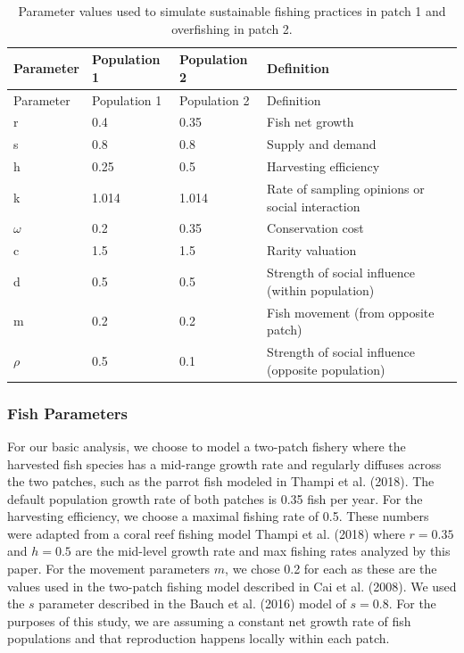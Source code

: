 \documentclass[
  12pt,
]{article}
\begin{document}
\begin{longtable}[]{@{}llll@{}}
\caption{\label{tab:DispersionParamTable}Parameter values used to simulate sustainable fishing practices in patch 1 and overfishing in patch 2. \label{DispersionParamTable}}\tabularnewline
\toprule()
Parameter & Population 1 & Population 2 & Definition \\
\midrule()
\endfirsthead
\toprule()
Parameter & Population 1 & Population 2 & Definition \\
\midrule()
\endhead
r & 0.4 & 0.35 & Fish net growth \\
s & 0.8 & 0.8 & Supply and demand \\
h & 0.25 & 0.5 & Harvesting efficiency \\
k & 1.014 & 1.014 & Rate of sampling opinions or social interaction \\
\(\omega\) & 0.2 & 0.35 & Conservation cost \\
c & 1.5 & 1.5 & Rarity valuation \\
d & 0.5 & 0.5 & Strength of social influence (within population) \\
m & 0.2 & 0.2 & Fish movement (from opposite patch) \\
\(\rho\) & 0.5 & 0.1 & Strength of social influence (opposite population) \\
\bottomrule()
\end{longtable}

\hypertarget{fish-parameters}{%
\subsubsection{Fish Parameters}\label{fish-parameters}}

For our basic analysis, we choose to model a two-patch fishery where the harvested fish species has a mid-range growth rate and regularly diffuses across the two patches, such as the parrot fish modeled in Thampi et al. (2018). The default population growth rate of both patches is 0.35 fish per year. For the harvesting efficiency, we choose a maximal fishing rate of 0.5. These numbers were adapted from a coral reef fishing model Thampi et al. (2018) where \(r = 0.35\) and \(h = 0.5\) are the mid-level growth rate and max fishing rates analyzed by this paper. For the movement parameters \(m\), we chose 0.2 for each as these are the values used in the two-patch fishing model described in Cai et al. (2008). We used the \(s\) parameter described in the Bauch et al. (2016) model of \(s = 0.8\). For the purposes of this study, we are assuming a constant net growth rate of fish populations and that reproduction happens locally within each patch.
\end{document}
